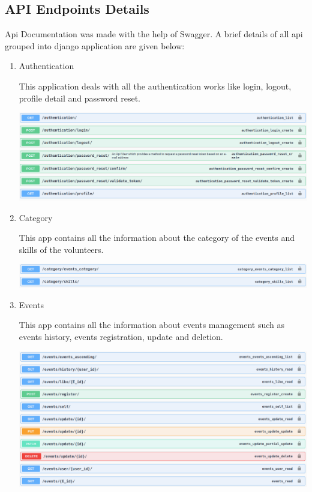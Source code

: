 \documentclass[12pt]{article}
\begin{document}
\clearpage
\clearpage

\subsection{API Endpoints Details}
Api Documentation was made with the help of Swagger. A brief details of all api grouped into django application are given below:

\begin{enumerate}
	\item Authentication
	
	This application deals with all the authentication works like login, logout, profile detail and password reset.

	\includegraphics[scale = 0.35]{auth.png}			
	
	\item Category
	
	This app contains all the information about the category of the events and skills of the volunteers.	
	
	\includegraphics[scale = 0.35]{category.png}	
	
	\item Events
	
	This app contains all the information about events management such as events history, events registration, update and deletion.
	
	\includegraphics[scale = 0.35]{events.png}		


\end{enumerate}
\end{document}
